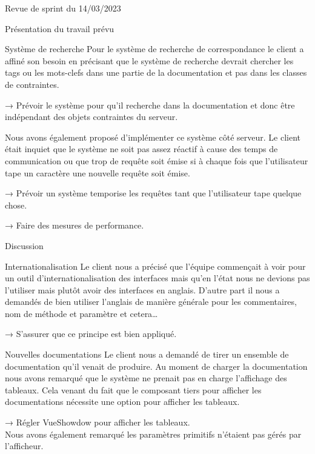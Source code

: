 \documentclass[]{article}
\begin{document}
{\begin{section}{Revue de sprint du 14/03/2023}
 \begin{subsection}{Présentation du travail prévu}
     \begin{subsubsection}{Système de recherche}
         Pour le système de recherche de correspondance le client a affiné son besoin en précisant que le système de recherche devrait chercher les tags ou les mots-clefs dans une partie de la documentation et pas dans les classes de contraintes.

         → Prévoir le système pour qu’il recherche dans la documentation et donc être indépendant des objets contraintes du serveur.

         Nous avons également proposé d’implémenter ce système côté serveur. Le client était inquiet que le système ne soit pas assez réactif à cause des temps de communication ou que trop de requête soit émise si à chaque fois que l’utilisateur tape un caractère une nouvelle requête soit émise.

         → Prévoir un système temporise les requêtes tant que l’utilisateur tape quelque chose.

         → Faire des mesures de performance.
     \end{subsubsection}
 \end{subsection}

 \begin{subsection}{Discussion}
     \begin{subsubsection}{Internationalisation}
         Le client nous a précisé que l’équipe commençait à voir pour un outil d’internationalisation des interfaces mais qu’en l’état nous ne devions pas l’utiliser mais plutôt avoir des interfaces en anglais. D’autre part il nous a demandés de bien utiliser l’anglais de manière générale pour les commentaires, nom de méthode et paramètre et cetera…

         → S’assurer que ce principe est bien appliqué.
     \end{subsubsection}

     \begin{subsubsection}{Nouvelles documentations}
         Le client nous a demandé de tirer un ensemble de documentation qu’il venait de produire. Au moment de charger la documentation nous avons remarqué que le système ne prenait pas en charge l’affichage des tableaux. Cela venant du fait que le composant tiers pour afficher les documentations nécessite une option pour afficher les tableaux.

         → Régler VueShowdow pour afficher les tableaux.
         \\[5mm]
         Nous avons également remarqué les paramètres primitifs n’étaient pas gérés par l’afficheur.


\end{subsubsection}
\end{subsection}
\end{section}}
\end{document}
